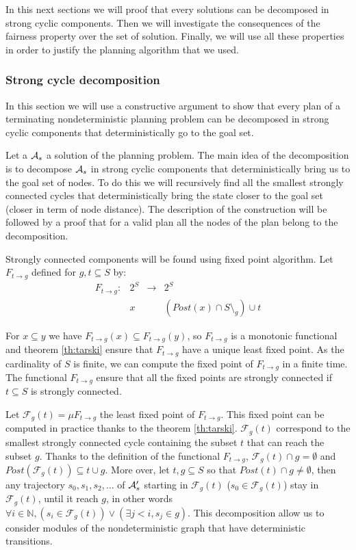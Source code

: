 In this next sections we will proof that every solutions can be decomposed in strong cyclic components.
Then we will investigate the consequences of the fairness property over the set of solution.
Finally, we will use all these properties in order to justify the planning algorithm that we used.

\subsubsection{Strong cycle decomposition}
In this section we will use a constructive argument to show that every plan of a terminating nondeterministic planning problem can be decomposed in strong cyclic components that deterministically go to the goal set.

Let a $\mathcal{A}_s$ a solution of the planning problem.
The main idea of the decomposition is to decompose $\mathcal{A}_s$ in strong cyclic components that deterministically bring us to the goal set of nodes.
To do this we will recursively find all the smallest strongly connected cycles that deterministically bring the state closer to the goal set (closer in term of node distance).
The description of the construction will be followed by a proof that for a valid plan  all the nodes of the plan belong to the decomposition.

Strongly connected components will be found using fixed point algorithm.
Let $F_{t \rightarrow g}$ defined for $g,t \subseteq S$ by:
\begin{equation}
\begin{array}{llll}
F_{t \rightarrow g} :& 2^S & \rightarrow & 2^S\\
 & x &  & (Post(x) \cap S \setminus_g) \cup t
\end{array}
\end{equation}


For $x \subseteq y$ we have $F_{t \rightarrow g} (x) \subseteq F_{t \rightarrow g}(y)$, so $F_{t \rightarrow g}$ is a monotonic functional and theorem \ref{th:tarski} ensure that $F_{t \rightarrow g}$ have a unique least fixed point.
As the cardinality of $S$ is finite, we can compute the fixed point of $F_{t \rightarrow g}$ in a finite time.
The functional $F_{t \rightarrow g}$ ensure that all the fixed points are strongly connected if $t \subseteq S$ is strongly connected.

Let $\mathcal{F}_g(t) = \mu F_{t \rightarrow g}$ the least fixed point of $F_{t \rightarrow g}$.
This fixed point can be computed in practice thanks to the theorem \ref{th:tarski}.
$\mathcal{F}_g(t)$ correspond to the smallest strongly connected cycle containing the subset $t$ that can reach the subset $g$.
Thanks to the definition of the functional $F_{t \rightarrow g}$, $\mathcal{F}_g(t) \cap g = \emptyset$ and $Post(\mathcal{F}_g(t)) \subseteq t \cup g$.
More over, let $t,g \subseteq S$ so that $Post(t) \cap g \neq \emptyset$, then any trajectory $s_0,s_1,s_2,...$ of $\mathcal{A}_s'$ starting in $\mathcal{F}_g(t)$ ($s_0 \in \mathcal{F}_g(t)$) stay in $\mathcal{F}_g(t)$, until it reach $g$, in other words $\forall i\in \mathbb{N}, (s_i \in \mathcal{F}_g(t)) \lor (\exists j<i, s_j \in g)$.
This decomposition allow us to consider modules of the nondeterministic graph that have deterministic transitions.

